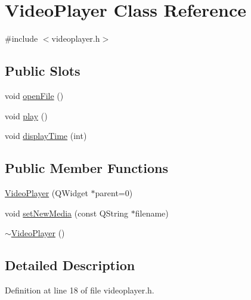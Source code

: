 \hypertarget{class_video_player}{\section{\-Video\-Player \-Class \-Reference}
\label{class_video_player}
}


{\ttfamily \#include $<$videoplayer.\-h$>$}

\subsection*{\-Public \-Slots}
\begin{DoxyCompactItemize}
\item 
void \hyperlink{class_video_player_a96b3bad4d8680ba4b41b05aeabcd26b1}{open\-File} ()
\item 
void \hyperlink{class_video_player_a13ba0d270e849566f33ceffd7fb425c0}{play} ()
\item 
void \hyperlink{class_video_player_a7e7d8a5f78a0050b463d303a6ce0df4f}{display\-Time} (int)
\end{DoxyCompactItemize}
\subsection*{\-Public \-Member \-Functions}
\begin{DoxyCompactItemize}
\item 
\hyperlink{class_video_player_a1d43337dac90ba3ec1ba178f4b1ddceb}{\-Video\-Player} (\-Q\-Widget $\ast$parent=0)
\item 
void \hyperlink{class_video_player_a9f33fb15ac14c330e8b6fda8d9cf4164}{set\-New\-Media} (const \-Q\-String $\ast$filename)
\item 
\hyperlink{class_video_player_a84982600649b54d2fa2ddb4efee2349f}{$\sim$\-Video\-Player} ()
\end{DoxyCompactItemize}


\subsection{\-Detailed \-Description}


\-Definition at line 18 of file videoplayer.\-h.



